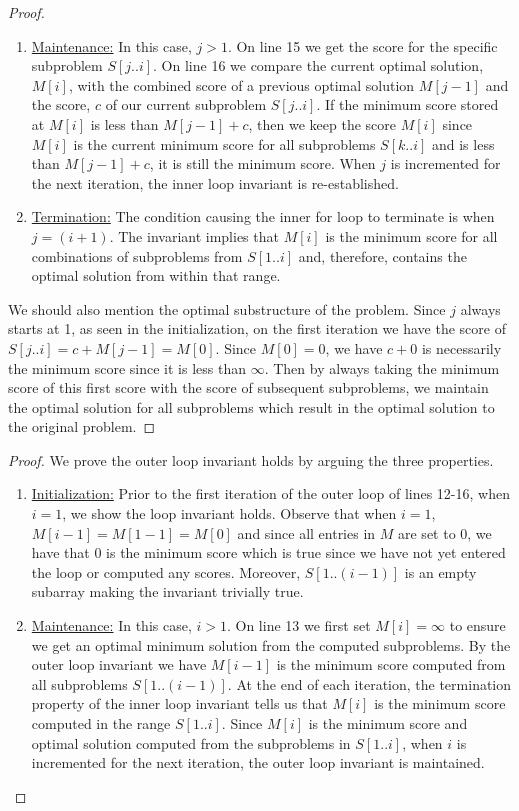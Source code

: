 \documentclass[11pt]{article}
\theoremstyle{nonumberplain}
\newtheorem{proof}{Proof}
\begin{document}
\begin{enumerate}
\begin{proof}
\begin{enumerate}
      \item \ul{Maintenance:} In this case, $j>1$. On line 15 we get the score for the specific subproblem $S[j..i]$. On line 16 we compare the current optimal solution, $M[i]$, with the combined score of a previous optimal solution $M[j-1]$ and the score, $c$ of our current subproblem $S[j..i]$. If the minimum score stored at $M[i]$ is less than $M[j-1]+c$, then we keep the score $M[i]$ since $M[i]$ is the current minimum score for all subproblems $S[k..i]$ and is less than $M[j-1]+c$, it is still the minimum score. When $j$ is incremented for the next iteration, the inner loop invariant is re-established.
      \item \ul{Termination:} The condition causing the inner for loop to terminate is when $j=(i+1)$. The invariant implies that $M[i]$ is the minimum score for all combinations of subproblems from $S[1..i]$ and, therefore, contains the optimal solution from within that range.
  \end{enumerate}
  We should also mention the optimal substructure of the problem. Since $j$ always starts at 1, as seen in the initialization, on the first iteration we have the score of $S[j..i]=c+M[j-1]=M[0]$. Since $M[0]=0$, we have $c+0$ is necessarily the minimum score since it is less than $\infty$. Then by always taking the minimum score of this first score with the score of subsequent subproblems, we maintain the optimal solution for all subproblems which result in the optimal solution to the original problem. 
  \end{proof}
  \begin{proof}
  We prove the outer loop invariant holds by arguing the three properties.
  \begin{enumerate}
      \item \ul{Initialization:} Prior to the first iteration of the outer loop of lines 12-16, when $i=1$, we show the loop invariant holds. Observe that when $i=1$, $M[i-1]=M[1-1]=M[0]$ and since all entries in $M$ are set to 0, we have that 0 is the minimum score which is true since we have not yet entered the loop or computed any scores. Moreover, $S[1..(i-1)]$ is an empty subarray making the invariant trivially true.
      \item \ul{Maintenance:} In this case, $i>1$. On line 13 we first set $M[i]=\infty$ to ensure we get an optimal minimum solution from the computed subproblems. By the outer loop invariant we have $M[i-1]$ is the minimum score computed from all subproblems $S[1..(i-1)]$. At the end of each iteration, the termination property of the inner loop invariant tells us that $M[i]$ is the minimum score computed in the range $S[1..i]$. Since $M[i]$ is the minimum score and optimal solution computed from the subproblems in $S[1..i]$, when $i$ is incremented for the next iteration, the outer loop invariant is maintained.

\end{enumerate}
\end{proof}
\end{enumerate}
\end{document}
